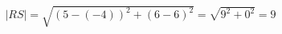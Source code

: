\documentclass[preview]{standalone}
\begin{document}
\begin{align*}
|RS| = \sqrt{(5-(-4))^2 + (6-6)^2} = \sqrt{9^2 + 0^2} = 9
\end{align*}
\end{document}
